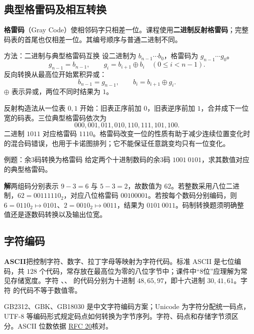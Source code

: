 \documentclass[UTF8,fontset=none,zihao=-4,a4paper]{ctexart}
\newcommand{\term}[1]{\textbf{#1}}
\newcommand{\sol}{\par\noindent\textbf{解}\quad}
\newcommand{\code}[1]{\allowbreak{\small\texttt{\detokenize{#1}}}\allowbreak}
\begin{document}
\subsection{典型格雷码及相互转换}
\term{格雷码}（Gray Code）使相邻码字只相差一位。课程使用\term{二进制反射格雷码}；完整码表的首尾也仅相差一位。其编号顺序与普通二进制不同。
\begin{infobox}{方法：二进制与典型格雷码互换}
设二进制为 $b_{n-1}\cdots b_0$，格雷码为 $g_{n-1}\cdots g_0$。
\[
g_{n-1}=b_{n-1},\qquad g_i=b_{i+1}\oplus b_i\quad(0\le i<n-1).
\]
反向转换从最高位开始累积异或：
\[
b_{n-1}=g_{n-1},\qquad b_i=b_{i+1}\oplus g_i.
\]
$\oplus$ 表示异或，两位不同时结果为 $1$。
\end{infobox}
反射构造法从一位表 $0,1$ 开始：旧表正序前加 $0$，旧表逆序前加 $1$，合并成下一位宽的码表。三位典型格雷码依次为
\[
000,001,011,010,110,111,101,100.
\]
二进制 $1011$ 对应格雷码 $1110$。格雷码改变一位的性质有助于减少连续位置变化时的混合码错误，也用于卡诺图排列；它不能保证任意跳变均只有一位变化。

\begin{infobox}{例题：余3码转换为格雷码}
给定两个十进制数码的余3码 $1001\ 0101$，求其数值对应的典型格雷码。
\end{infobox}
\sol 两组码分别表示 $9-3=6$ 与 $5-3=2$，故数值为 $62$。若整数采用八位二进制，$62=00111110_2$，对应八位格雷码 $00100001$。若按每个数码分别编码，则 $6=0110_2\mapsto0101$、$2=0010_2\mapsto0011$，结果为 $0101\ 0011$。码制转换题须明确整值还是逐数码转换以及输出位宽。

\subsection{字符编码}
\term{ASCII}把控制字符、数字、拉丁字母等映射为字符代码。标准 ASCII 是七位编码，共 $128$ 个代码，常存放在最高位为零的八位字节中；课件中“8位”应理解为常见存储宽度。字符 \code{0}、\code{A}、\code{a} 的代码分别为十进制 $48,65,97$，即十六进制 $30,41,61$。字符 \code{0} 的代码不等于数值零。

GB2312、GBK、GB18030 是中文字符编码方案；Unicode 为字符分配统一码点，UTF-8 等编码形式规定码点如何转换为字节序列。字符、码点和存储字节须区分。ASCII 位数依据 \href{https://www.rfc-editor.org/rfc/rfc20}{RFC 20}核对。
\end{document}
